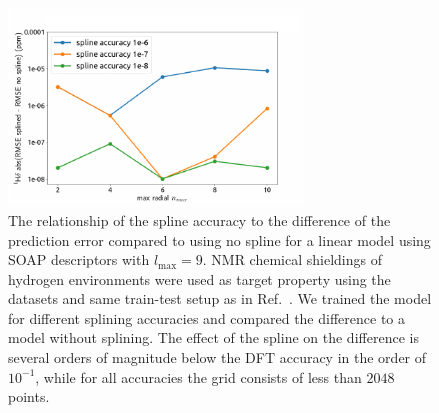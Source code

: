 \begin{figure}
    \centering
    \includegraphics[width=0.7\textwidth]{fig/spline-accuracy-v2.pdf}
    \caption{The relationship of the spline accuracy to the difference of the prediction error compared to using no spline for a linear model using SOAP descriptors with $l_\textrm{max}=9$.
      NMR chemical shieldings of hydrogen environments were used as target property using the datasets and same train-test setup as in Ref.~\cite{paru+18ncomm}.
      We trained the model for different splining accuracies and compared the difference to a model without splining.
    The effect of the spline on the difference is several orders of magnitude below the DFT accuracy in the order of $10^{-1}$, while for all accuracies the grid consists of less than $2048$ points.}
    \label{fig:chemical_shift-spline}
\end{figure}

